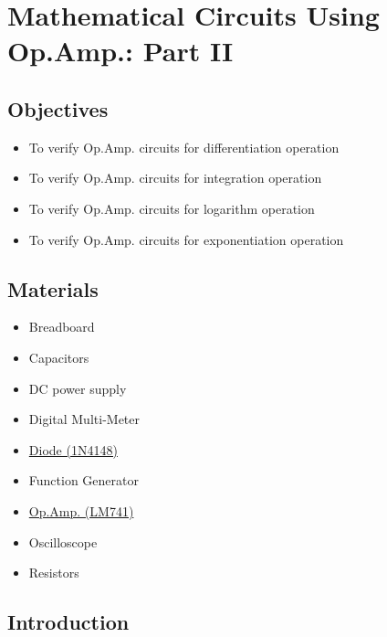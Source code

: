 \chapter{Mathematical Circuits Using Op.Amp.: Part II}


\section{Objectives}
\begin{itemize}
    \item To verify Op.Amp. circuits for differentiation operation
    \item To verify Op.Amp. circuits for integration operation
    \item To verify Op.Amp. circuits for logarithm operation
    \item To verify Op.Amp. circuits for exponentiation operation
\end{itemize}

\section{Materials}
\begin{itemize}
    \item Breadboard
    \item Capacitors
    \item DC power supply
    \item Digital Multi-Meter
    \item \hyperref[1N4148]{Diode (1N4148)}
    \item Function Generator
    \item \hyperref[LM741_1]{Op.Amp. (LM741)}
    \item Oscilloscope
    \item Resistors
\end{itemize}

\section{Introduction}
